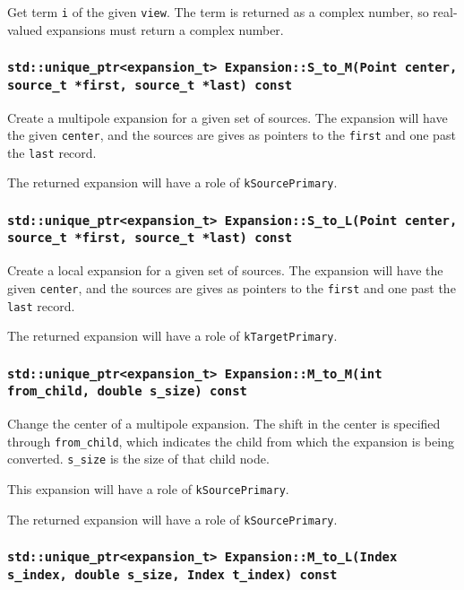 Get term \texttt{i} of the given \texttt{view}. The term is returned as a
complex number, so real-valued expansions must return a complex number.

\subsubsection{\texttt{std::unique\_ptr<expansion\_t> Expansion::S\_to\_M(Point center, source\_t *first, source\_t *last) const}}

Create a multipole expansion for a given set of sources. The expansion will
have the given \texttt{center}, and the sources are gives as pointers to the
\texttt{first} and one past the \texttt{last} record.

The returned expansion will have a role of \texttt{kSourcePrimary}.

\subsubsection{\texttt{std::unique\_ptr<expansion\_t> Expansion::S\_to\_L(Point center, source\_t *first, source\_t *last) const}}

Create a local expansion for a given set of sources. The expansion will
have the given \texttt{center}, and the sources are gives as pointers to the
\texttt{first} and one past the \texttt{last} record.

The returned expansion will have a role of \texttt{kTargetPrimary}.

\subsubsection{\texttt{std::unique\_ptr<expansion\_t> Expansion::M\_to\_M(int from\_child, double s\_size) const}}

Change the center of a multipole expansion. The shift in the center is
specified through \texttt{from\_child}, which indicates the child from which
the expansion is being converted. \texttt{s\_size} is the size of that child
node.

This expansion will have a role of \texttt{kSourcePrimary}.

The returned expansion will have a role of \texttt{kSourcePrimary}.


\subsubsection{\texttt{std::unique\_ptr<expansion\_t> Expansion::M\_to\_L(Index s\_index, double s\_size, Index t\_index) const}}

